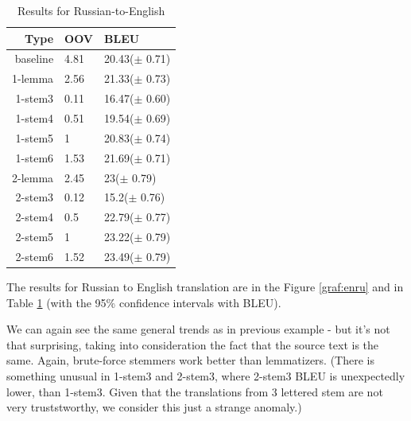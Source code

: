 \documentclass[11pt,letterpaper]{article}
\begin{document}
\begin{table}

\begin{center}
\begin{tabular}{|r|l|l|}
  \hline
  \textbf{Type} & \textbf{OOV} & \textbf{BLEU} \\
\hline



baseline & 4.81 & 20.43($\pm$ 0.71) \\ \hline %
1-lemma & 2.56 & 21.33($\pm$ 0.73) \\ \hline %
1-stem3 & 0.11 & 16.47($\pm$ 0.60) \\ \hline %
1-stem4 & 0.51 & 19.54($\pm$ 0.69) \\ \hline %
1-stem5 & 1 & 20.83($\pm$ 0.74) \\ \hline %
1-stem6 & 1.53 & 21.69($\pm$ 0.71) \\ \hline %
2-lemma & 2.45 & 23($\pm$ 0.79) \\ \hline %
2-stem3 & 0.12 & 15.2($\pm$ 0.76) \\ \hline %
2-stem4 & 0.5 & 22.79($\pm$ 0.77) \\ \hline %
2-stem5 & 1 & 23.22($\pm$ 0.79) \\ \hline %
2-stem6 & 1.52 & 23.49($\pm$ 0.79) \\ %

\hline
\end{tabular}
\end{center}
\caption{Results for Russian-to-English}
\label{tab:resen}
\end{table}
The results for Russian to English translation are in the Figure \ref{graf:enru} and in Table \ref{tab:resen} (with the 95\% confidence intervals with BLEU).

We can again see the same general trends as in previous example - but it's not that surprising, taking into consideration the fact that the source text is the same. Again, brute-force stemmers work better than lemmatizers. (There is something unusual in 1-stem3 and 2-stem3, where 2-stem3 BLEU is unexpectedly lower, than 1-stem3. Given that the translations from 3 lettered stem are not very truststworthy, we consider this just a strange anomaly.)
\end{document}
